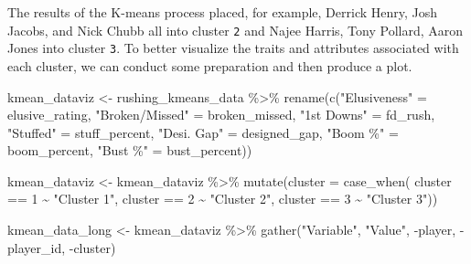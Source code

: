 \documentclass[
  letterpaper,
]{krantz}
\newenvironment{Shaded}{\begin{snugshade}}{\end{snugshade}}
\newcommand{\AttributeTok}[1]{\textcolor[rgb]{0.40,0.45,0.13}{#1}}
\newcommand{\DecValTok}[1]{\textcolor[rgb]{0.68,0.00,0.00}{#1}}
\newcommand{\FunctionTok}[1]{\textcolor[rgb]{0.28,0.35,0.67}{#1}}
\newcommand{\NormalTok}[1]{\textcolor[rgb]{0.00,0.23,0.31}{#1}}
\newcommand{\OtherTok}[1]{\textcolor[rgb]{0.00,0.23,0.31}{#1}}
\newcommand{\SpecialCharTok}[1]{\textcolor[rgb]{0.37,0.37,0.37}{#1}}
\newcommand{\StringTok}[1]{\textcolor[rgb]{0.13,0.47,0.30}{#1}}
\begin{document}
\begin{Shaded}
\end{Shaded}

The results of the K-means process placed, for example, Derrick Henry,
Josh Jacobs, and Nick Chubb all into cluster \texttt{2} and Najee
Harris, Tony Pollard, Aaron Jones into cluster \texttt{3}. To better
visualize the traits and attributes associated with each cluster, we can
conduct some preparation and then produce a plot.

\begin{Shaded}
\begin{Highlighting}[]
\NormalTok{kmean\_dataviz }\OtherTok{\textless{}{-}}\NormalTok{ rushing\_kmeans\_data }\SpecialCharTok{\%\textgreater{}\%}
  \FunctionTok{rename}\NormalTok{(}\FunctionTok{c}\NormalTok{(}\StringTok{"Elusiveness"} \OtherTok{=}\NormalTok{ elusive\_rating,}
           \StringTok{"Broken/Missed"} \OtherTok{=}\NormalTok{ broken\_missed,}
           \StringTok{"1st Downs"} \OtherTok{=}\NormalTok{ fd\_rush,}
           \StringTok{"Stuffed"} \OtherTok{=}\NormalTok{ stuff\_percent,}
           \StringTok{"Desi. Gap"} \OtherTok{=}\NormalTok{ designed\_gap,}
           \StringTok{"Boom \%"} \OtherTok{=}\NormalTok{ boom\_percent,}
           \StringTok{"Bust \%"} \OtherTok{=}\NormalTok{ bust\_percent))}

\NormalTok{kmean\_dataviz }\OtherTok{\textless{}{-}}\NormalTok{ kmean\_dataviz }\SpecialCharTok{\%\textgreater{}\%}
  \FunctionTok{mutate}\NormalTok{(}\AttributeTok{cluster =} \FunctionTok{case\_when}\NormalTok{(}
\NormalTok{    cluster }\SpecialCharTok{==} \DecValTok{1} \SpecialCharTok{\textasciitilde{}} \StringTok{"Cluster 1"}\NormalTok{,}
\NormalTok{    cluster }\SpecialCharTok{==} \DecValTok{2} \SpecialCharTok{\textasciitilde{}} \StringTok{"Cluster 2"}\NormalTok{,}
\NormalTok{    cluster }\SpecialCharTok{==} \DecValTok{3} \SpecialCharTok{\textasciitilde{}} \StringTok{"Cluster 3"}\NormalTok{))}

\NormalTok{kmean\_data\_long }\OtherTok{\textless{}{-}}\NormalTok{ kmean\_dataviz }\SpecialCharTok{\%\textgreater{}\%}
  \FunctionTok{gather}\NormalTok{(}\StringTok{"Variable"}\NormalTok{, }\StringTok{"Value"}\NormalTok{, }\SpecialCharTok{{-}}\NormalTok{player, }\SpecialCharTok{{-}}\NormalTok{player\_id, }\SpecialCharTok{{-}}\NormalTok{cluster)}
\end{Highlighting}
\end{Shaded}
\end{document}
